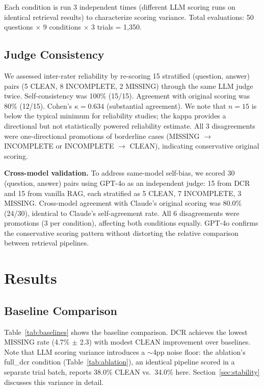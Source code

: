 \documentclass[11pt,a4paper]{article}
\begin{document}
Each condition is run 3 independent times (different LLM scoring runs on identical retrieval results) to characterize scoring variance. Total evaluations: 50 questions $\times$ 9 conditions $\times$ 3 trials = 1,350.

\subsection{Judge Consistency}
\label{sec:judge}

We assessed inter-rater reliability by re-scoring 15 stratified (question, answer) pairs (5 CLEAN, 8 INCOMPLETE, 2 MISSING) through the same LLM judge twice. Self-consistency was 100\% (15/15). Agreement with original scoring was 80\% (12/15). Cohen's $\kappa = 0.634$ (substantial agreement). We note that $n = 15$ is below the typical minimum for reliability studies; the kappa provides a directional but not statistically powered reliability estimate. All 3 disagreements were one-directional promotions of borderline cases (MISSING $\to$ INCOMPLETE or INCOMPLETE $\to$ CLEAN), indicating conservative original scoring.

\textbf{Cross-model validation.} To address same-model self-bias, we scored 30 (question, answer) pairs using GPT-4o as an independent judge: 15 from DCR and 15 from vanilla RAG, each stratified as 5 CLEAN, 7 INCOMPLETE, 3 MISSING. Cross-model agreement with Claude's original scoring was 80.0\% (24/30), identical to Claude's self-agreement rate. All 6 disagreements were promotions (3 per condition), affecting both conditions equally. GPT-4o confirms the conservative scoring pattern without distorting the relative comparison between retrieval pipelines.

\section{Results}
\label{sec:results}

\subsection{Baseline Comparison}

Table~\ref{tab:baselines} shows the baseline comparison. DCR achieves the lowest MISSING rate (4.7\% $\pm$ 2.3) with modest CLEAN improvement over baselines. Note that LLM scoring variance introduces a $\sim$4pp noise floor: the ablation's full\_dcr condition (Table~\ref{tab:ablation}), an identical pipeline scored in a separate trial batch, reports 38.0\% CLEAN vs.\ 34.0\% here. Section~\ref{sec:stability} discusses this variance in detail.
\end{document}
